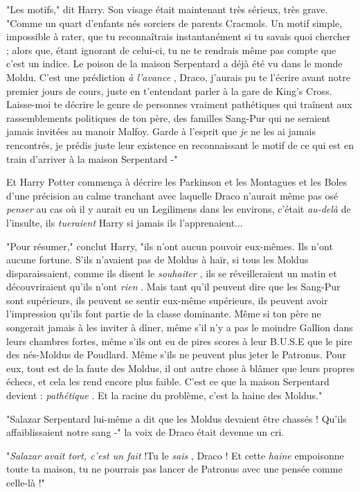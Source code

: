 "Les motifs," dit Harry. Son visage était maintenant très sérieux, très grave. "Comme un quart d'enfants nés sorciers de parents Cracmols. Un motif simple, impossible à rater, que tu reconnaîtrais instantanément si tu savais quoi chercher ; alors que, étant ignorant de celui-ci, tu ne te rendrais même pas compte que c'est un indice. Le poison de la maison Serpentard a déjà été vu dans le monde Moldu. C'est une prédiction \emph{à l'avance} , Draco, j'aurais pu te l'écrire avant notre premier jours de cours, juste en t'entendant parler à la gare de King's Cross. Laisse-moi te décrire le genre de personnes vraiment pathétiques qui traînent aux rassemblements politiques de ton père, des familles Sang-Pur qui ne seraient jamais invitées au manoir Malfoy. Garde à l'esprit que \emph{je}  ne les ai jamais rencontrés, je prédis juste leur existence en reconnaissant le motif de ce qui est en train d'arriver à la maison Serpentard -"

Et Harry Potter commença à décrire les Parkinson et les Montagues et les Boles d'une précision au calme tranchant avec laquelle Draco n'aurait même pas osé \emph{penser}  au cas où il y aurait eu un Legilimens dans les environs, c'était \emph{au-delà}  de l'insulte, ils \emph{tueraient}  Harry si jamais ils l'apprenaient...

"Pour résumer," conclut Harry, "ils n'ont aucun pouvoir eux-mêmes. Ils n'ont aucune fortune. S'ils n'avaient pas de Moldus à haïr, si tous les Moldus disparaissaient, comme ils disent le \emph{souhaiter} , ils se réveilleraient un matin et découvriraient qu'ils n'ont \emph{rien} . Mais tant qu'il peuvent dire que les Sang-Pur sont supérieurs, ils peuvent se sentir eux-même supérieurs, ils peuvent avoir l'impression qu'ils font partie de la classe dominante. Même si ton père ne songerait jamais à les inviter à dîner, même s'il n'y a pas le moindre Gallion dans leurs chambres fortes, même s'ils ont eu de pires scores à leur B.U.S.E que le pire des nés-Moldus de Poudlard. Même s'ils ne peuvent plus jeter le Patronus. Pour eux, tout est de la faute des Moldus, il ont autre chose à blâmer que leurs propres échecs, et cela les rend encore plus faible. C'est ce que la maison Serpentard devient : \emph{pathétique} . Et la racine du problème, c'est la haine des Moldus."

"Salazar Serpentard lui-même a dit que les Moldus devaient être chassés ! Qu'ils affaiblissaient notre sang -" la voix de Draco était devenue un cri.

"\emph{Salazar avait tort, c'est un fait } !Tu le \emph{sais} , Draco ! Et cette \emph{haine}  empoisonne toute ta maison, tu ne pourrais pas lancer de Patronus avec une pensée comme celle-là !"

